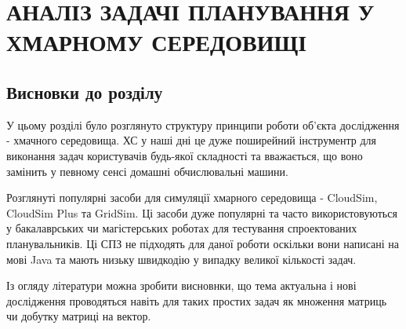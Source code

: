 \chapter{АНАЛІЗ ЗАДАЧІ ПЛАНУВАННЯ У ХМАРНОМУ СЕРЕДОВИЩІ}







\section*{Висновки до розділу}

У цьому розділі було розглянуто структуру принципи роботи об'єкта дослідження - хмачного середовища. ХС у наші дні це дуже поширейний інструментр для виконання задач користувачів будь-якої складності та вважається, що воно замінить у певному сенсі домашні обчислювальні машини.

Розглянуті популярні засоби для симуляції хмарного середовища - CloudSim, CloudSim Plus та GridSim. Ці засоби дуже популярні та часто використовуються у бакалаврських чи магістерських роботах для тестування спроектованих планувальників. Ці СПЗ не підходять для даної роботи оскільки вони написані на мові Java та мають низьку швидкодію у випадку великої кількості задач.

Із огляду літератури можна зробити висновнки, що тема актуальна і нові дослідження проводяться навіть для таких простих задач як множення матриць чи добутку матриці на вектор.